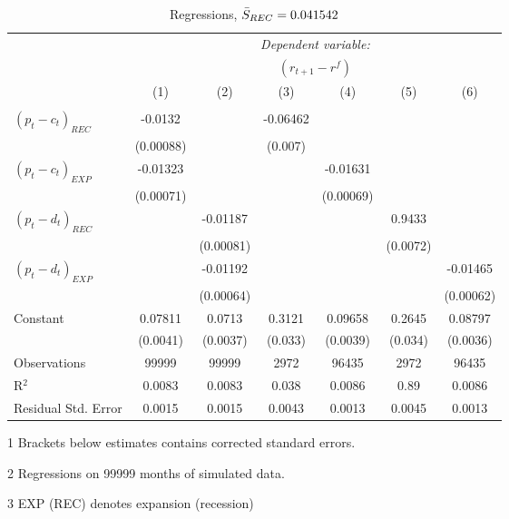 \begin{table}[H]
\centering   
  \caption{Regressions, $\Bar{S}_{REC} = 0.041542$}           
  \label{tab:regress1}     
  \begin{threeparttable}
\begin{tabular}{@{\hspace{5pt}}l@{\hspace{5pt}}cccccc} 
\toprule 
 & \multicolumn{6}{c}{\textit{Dependent variable:}} \\ 
 & \multicolumn{6}{c}{$\left(r_{t+1}-r^f\right)$} \\ 
 \cmidrule(rr){2-7}
 & (1) & (2) & (3) & (4) & (5) & (6) \\ 
\midrule  
\\[-2.1ex] $\left( p_t - c_t \right)_{REC}$ &-0.0132& &-0.06462 & & &\\ 
  & (0.00088) & &(0.007) & & & \\ 
 \addlinespace 
  $\left( p_t - c_t \right)_{EXP}$ &-0.01323  &    & &-0.01631 & &  \\ 
  & (0.00071) & & &(0.00069) & & \\ 
 \addlinespace 
  $\left( p_t - d_t \right)_{REC}$ & &-0.01187& & & 0.9433  &   \\ 
                                   & &  (0.00081) & & & (0.0072) &    \\ 
 \addlinespace 
  $\left( p_t - d_t \right)_{EXP}$ & &   -0.01192& & & &-0.01465 \\ 
                                   & &  (0.00064) & & & &(0.00062) \\ 
 \addlinespace 
 Constant &0.07811 &0.0713&0.3121 &0.09658 &0.2645 &0.08797 \\ 
          &(0.0041) &(0.0037)&(0.033)&(0.0039)&(0.034)&(0.0036) \\ 
 \addlinespace 
\midrule  
Observations & 99999 & 99999&2972 & 96435&2972&96435\\
R$^{2}$ &0.0083 & 0.0083&0.038&0.0086&0.89&0.0086 \\ 
Residual Std. Error &0.0015 & 0.0015&0.0043&0.0013&0.0045&0.0013 \\ 
\bottomrule 
\end{tabular} 
\begin{tablenotes}
\footnotesize{
\item[1] Brackets below estimates contains \citet{NW87} corrected standard errors. 
\item[2] Regressions on 99999 months of simulated data.
\item[3] EXP (REC) denotes expansion (recession)
}
\end{tablenotes}
\end{threeparttable}
\end{table} 
